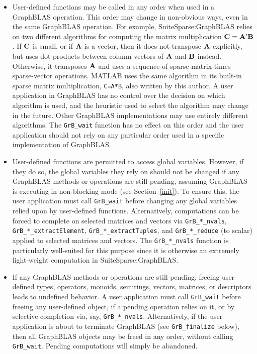 \documentclass[12pt]{article}
\begin{document}
\begin{itemize}

\item User-defined functions may be called in any order when used in a
    GraphBLAS operation.  This order may change in non-obvious ways, even in
    the same GraphBLAS operation.  For example, SuiteSparse:\-GraphBLAS relies
    on two different algorithms for computing the matrix multiplication ${\bf
    C=A'B}$.  If ${\bf C}$ is small, or if ${\bf A}$ is a vector, then it does
    not transpose ${\bf A}$ explicitly, but uses dot-products between column
    vectors of ${\bf A}$ and ${\bf B}$ instead.  Otherwise, it transposes ${\bf
    A}$ and uses a sequence of sparse-matrix-times-sparse-vector operations.
    MATLAB uses the same algorithm in its built-in sparse matrix
    multiplication, \verb'C=A*B', also written by this author.  A user
    application in GraphBLAS has no control over the decision on which
    algorithm is used, and the heuristic used to select the algorithm may
    change in the future.  Other GraphBLAS implementations may use entirely
    different algorithms.  The \verb'GrB_wait' function has no effect on this
    order and the user application should not rely on any particular order used
    in a specific implementation of GraphBLAS.

\item User-defined functions are permitted to access global variables.
    However, if they do so, the global variables they rely on should not be
    changed if any GraphBLAS methods or operations are still pending, assuming
    GraphBLAS is executing in non-blocking mode (see Section~\ref{init}).  To
    ensure this, the user application must call \verb'GrB_wait' before changing
    any global variables relied upon by user-defined functions.  Alternatively,
    computations can be forced to complete on selected matrices and vectors via
    \verb'GrB_*_nvals', \verb'GrB_*_extractElement',
    \verb'GrB_*_extractTuples', and \verb'GrB_*_reduce' (to scalar) applied to
    selected matrices and vectors.  The \verb'GrB_*_nvals' function is
    particularly well-suited for this purpose since it is otherwise an
    extremely light-weight computation in SuiteSparse:GraphBLAS.

\item If any GraphBLAS methods or operations are still pending, freeing
    user-defined types, operators, monoids, semirings, vectors, matrices, or
    descriptors leads to undefined behavior.  A user application must call
    \verb'GrB_wait' before freeing any user-defined object, if a pending
    operation relies on it, or by selective completion via, say,
    \verb'GrB_*_nvals'.  Alternatively, if the user application is about to
    terminate GraphBLAS (see \verb'GrB_finalize' below), then all GraphBLAS
    objects may be freed in any order, without calling \verb'GrB_wait'.
    Pending computations will simply be abandoned.

\end{itemize}
\end{document}
